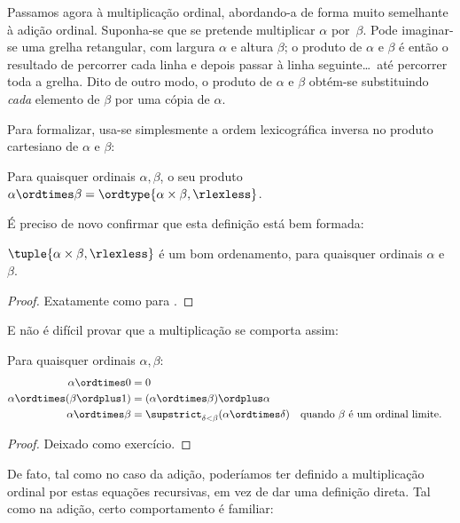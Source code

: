 \documentclass[../../../include/open-logic-section]{subfiles}
\begin{document}


Passamos agora à multiplicação ordinal, abordando-a de forma muito
semelhante à adição ordinal. Suponha-se que se pretende multiplicar $\alpha$
por~$\beta$. Pode imaginar-se uma grelha retangular, com largura $\alpha$
e altura $\beta$; o produto de $\alpha$ e $\beta$ é então o
resultado de percorrer cada linha e depois passar à linha seguinte\ldots\
até percorrer toda a grelha. Dito de outro modo,
o produto de $\alpha$ e $\beta$ obtém-se substituindo \emph{cada}
elemento de $\beta$ por uma cópia de $\alpha$.

Para formalizar, usa-se simplesmente a ordem lexicográfica inversa
no produto cartesiano de $\alpha$ e $\beta$:

\begin{defn}
Para quaisquer ordinais $\alpha, \beta$, o seu produto $\alpha \ordtimes \beta = \ordtype{\alpha \times \beta, \rlexless}$.
\end{defn}
\noindent
É preciso de novo confirmar que esta definição está bem formada:

\begin{lem}
$\tuple{\alpha \times \beta, \rlexless}$ é um bom ordenamento, para quaisquer
ordinais $\alpha$ e $\beta$.
\end{lem}

\begin{proof}
Exatamente como para \olref[add]{ordsumlessiswo}.
\end{proof}
\noindent
E não é difícil provar que a multiplicação se comporta assim:

\begin{lem}
Para quaisquer ordinais $\alpha, \beta$:
\begin{align*}
	\alpha \ordtimes 0 &= 0\\
	\alpha \ordtimes (\beta \ordplus 1) &=
		(\alpha \ordtimes \beta) \ordplus \alpha\\
	\alpha  \ordtimes \beta &=
		\supstrict_{\delta < \beta}(\alpha \ordtimes \delta) &&
		\text{quando $\beta$ é um ordinal limite}.
\end{align*}
\end{lem}

\begin{proof}
Deixado como exercício.
\end{proof}

De fato, tal como no caso da adição, poderíamos ter definido a
multiplicação ordinal por estas equações recursivas, em vez de dar uma
definição direta. Tal como na adição, certo comportamento é
familiar:
\end{document}
